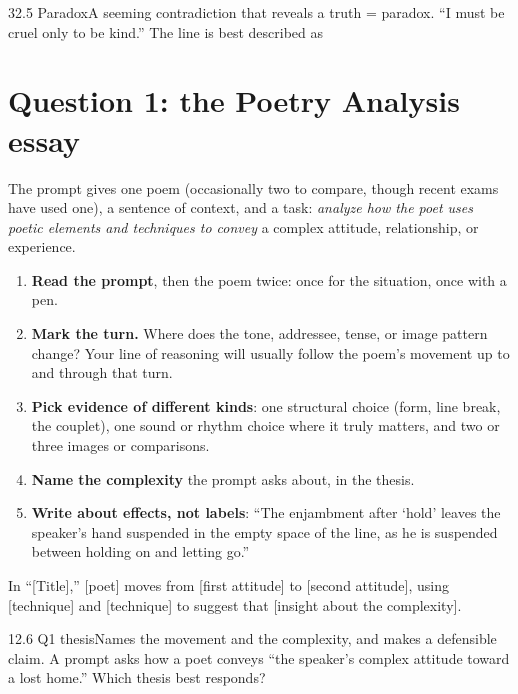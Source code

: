 \documentclass[11pt]{article}
\begin{document}
\begin{q}{3}{2.5 Paradox}{A seeming contradiction that reveals a truth = paradox.}
``I must be cruel only to be kind.'' The line is best described as
\end{q}

\section{Question 1: the Poetry Analysis essay}
\label{sec:6}

The prompt gives one poem (occasionally two to compare, though recent exams have used one), a sentence of context, and a task: \emph{analyze how the poet uses poetic elements and techniques to convey} a complex attitude, relationship, or experience.

\begin{enumerate}[leftmargin=1.6em]
\item \textbf{Read the prompt}, then the poem twice: once for the situation, once with a pen.
\item \textbf{Mark the turn.} Where does the tone, addressee, tense, or image pattern change? Your line of reasoning will usually follow the poem's movement up to and through that turn.
\item \textbf{Pick evidence of different kinds}: one structural choice (form, line break, the couplet), one sound or rhythm choice where it truly matters, and two or three images or comparisons.
\item \textbf{Name the complexity} the prompt asks about, in the thesis.
\item \textbf{Write about effects, not labels}: ``The enjambment after `hold' leaves the speaker's hand suspended in the empty space of the line, as he is suspended between holding on and letting go.''
\end{enumerate}

\begin{keyidea}
In ``[Title],'' [poet] moves from [first attitude] to [second attitude], using [technique] and [technique] to suggest that [insight about the complexity].
\end{keyidea}

\begin{q}{1}{2.6 Q1 thesis}{Names the movement and the complexity, and makes a defensible claim.}
A prompt asks how a poet conveys ``the speaker's complex attitude toward a lost home.'' Which thesis best responds?
\end{q}
\end{document}
